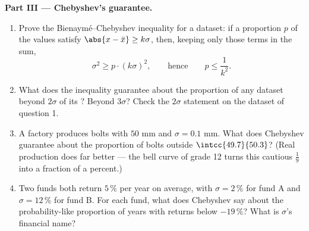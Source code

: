 \begin{problem}
\medskip
\noindent\textbf{Part III --- Chebyshev's guarantee.}
\begin{enumerate}[resume]
  \item Prove the Bienaym\'e--Chebyshev inequality for a
        dataset: if a proportion $p$ of the values satisfy
        $\abs{x - \bar x} \geq k\sigma$, then, keeping only
        those terms in the  sum,
        \[
        \sigma^2 \geq p \cdot (k\sigma)^2,
        \qquad\text{hence}\qquad
        p \leq \frac{1}{k^2} .
        \]
  \item What does the inequality guarantee about the proportion
        of any dataset beyond $2\sigma$ of its ? Beyond
        $3\sigma$? Check the $2\sigma$ statement on the dataset
        of question 1.
  \item A factory produces bolts with  $50$ mm and
        $\sigma = 0.1$ mm. What does Chebyshev guarantee about
        the proportion of bolts outside
        $\intcc{49.7}{50.3}$? (Real production does far better
        --- the bell curve of grade 12 turns this cautious
        $\frac19$ into a fraction of a percent.)
  \item Two funds both return $5\,\%$ per year on average, with
        $\sigma = 2\,\%$ for fund A and $\sigma = 12\,\%$ for
        fund B. For each fund, what does Chebyshev say about
        the probability-like proportion of years with returns
        below $-19\,\%$? What is $\sigma$'s financial name?
\end{enumerate}


\end{problem}
